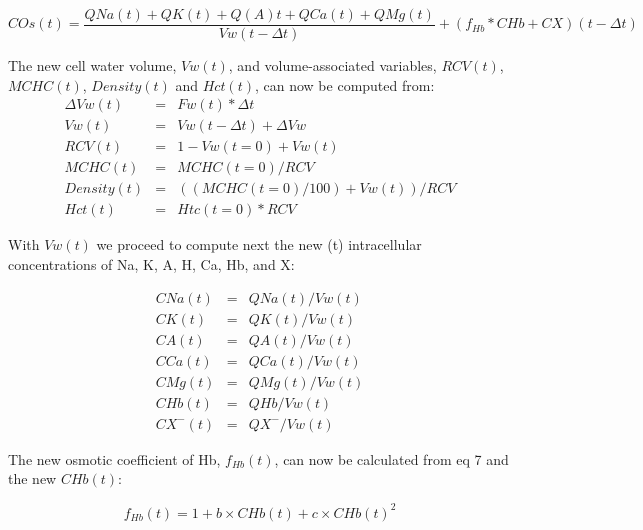\documentclass[a4paper]{article}
\newcommand{\cell}[1]{C#1}
\newcommand{\CNa}{\cell{Na}}
\newcommand{\CK}{\cell{K}}
\newcommand{\CA}{\cell{A}}
\newcommand{\CHb}{\cell{Hb}}
\newcommand{\CCa}{\cell{Ca}}
\newcommand{\CMg}{\cell{Mg}}
\newcommand{\CX}{\cell{X}}
\begin{document}
\begin{equation}
COs(t) = \frac{QNa(t) + QK(t) + Q(A)t + QCa(t) + QMg(t)}{Vw(t-\Delta t)}  + (f_{Hb}*\CHb + \CX )(t-\Delta t)
\end{equation}


\setcounter{equation}{0}
\renewcommand{\theequation}{23\alph{equation}}

The new cell water volume, $Vw(t)$, and volume-associated variables, $RCV(t)$, $MCHC(t)$, $Density(t)$ and $Hct(t)$, can now be computed from: 
\begin{eqnarray}
\Delta Vw(t) &=& Fw(t)*\Delta t \\
Vw(t) &=& Vw(t-\Delta t) + \Delta Vw \\
RCV(t) &=& 1-Vw(t=0) + Vw(t)  \\
MCHC(t) &=& MCHC(t=0)/RCV  \\
Density(t) &=& ((MCHC(t=0)/100) + Vw(t))/RCV  \\
Hct(t) &=& Htc(t=0)*RCV  
\end{eqnarray}

With $Vw(t)$ we proceed to compute next the new (t) intracellular concentrations of Na, K, A, H, Ca, Hb, and X:

\setcounter{equation}{0}
\renewcommand{\theequation}{24\alph{equation}}

\begin{eqnarray}
\CNa(t) &=& QNa(t)/Vw(t) \\
\CK(t) &=& QK(t)/Vw(t) \\
\CA(t) &=& QA(t)/Vw(t)  \\
\CCa(t) &=& QCa(t)/Vw(t)  \\
\CMg(t) &=& QMg(t)/Vw(t)  \\
\CHb(t) &=& QHb/Vw(t) \\
\CX^{-}(t) &=& QX^{-} /Vw(t)  
\end{eqnarray}

The new osmotic coefficient of Hb, $f_{Hb}(t)$, can now be calculated from eq 7 and the new $\CHb(t)$:

\setcounter{equation}{24}
\renewcommand{\theequation}{\arabic{equation}}

\begin{equation}
f_{Hb}(t) = 1 + b\times\CHb(t) + c\times CHb(t)^2
\end{equation}
\end{document}
